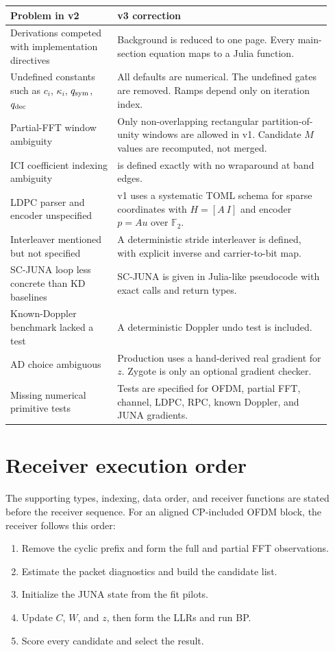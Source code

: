 \documentclass[11pt]{article}
\newcommand{\F}{\mathbb{F}}
\newcommand{\code}[1]{\texttt{\detokenize{#1}}}
\begin{document}
\begin{longtable}{@{}p{0.31\linewidth}p{0.62\linewidth}@{}}
\toprule
Problem in v2 & v3 correction \\
\midrule
Derivations competed with implementation directives & Background is reduced to one page. Every main-section equation maps to a Julia function. \\
Undefined constants such as $c_i$, $\kappa_i$, $q_{\rm sym}$, $q_{\rm dec}$ & All defaults are numerical. The undefined gates are removed. Ramps depend only on iteration index. \\
Partial-FFT window ambiguity & Only non-overlapping rectangular partition-of-unity windows are allowed in v1. Candidate $M$ values are recomputed, not merged. \\
ICI coefficient indexing ambiguity & \code{C[k, off, m]} is defined exactly with no wraparound at band edges. \\
LDPC parser and encoder unspecified & v1 uses a systematic TOML schema for sparse coordinates with $H=[A\ I]$ and encoder $p=A u$ over $\F_2$. \\
Interleaver mentioned but not specified & A deterministic stride interleaver is defined, with explicit inverse and carrier-to-bit map. \\
SC-JUNA loop less concrete than KD baselines & SC-JUNA is given in Julia-like pseudocode with exact calls and return types. \\
Known-Doppler benchmark lacked a test & A deterministic Doppler undo test is included. \\
AD choice ambiguous & Production uses a hand-derived real gradient for $z$. Zygote is only an optional gradient checker. \\
Missing numerical primitive tests & Tests are specified for OFDM, partial FFT, channel, LDPC, RPC, known Doppler, and JUNA gradients. \\
\bottomrule
\end{longtable}

\section{Receiver execution order}

The supporting types, indexing, data order, and receiver functions are stated
before the receiver sequence. For an aligned CP-included OFDM block, the
receiver follows this order:

\begin{enumerate}
\item Remove the cyclic prefix and form the full and partial FFT observations.
\item Estimate the packet diagnostics and build the candidate list.
\item Initialize the JUNA state from the fit pilots.
\item Update $C$, $W$, and $z$, then form the LLRs and run BP.
\item Score every candidate and select the result.
\end{enumerate}
\end{document}

